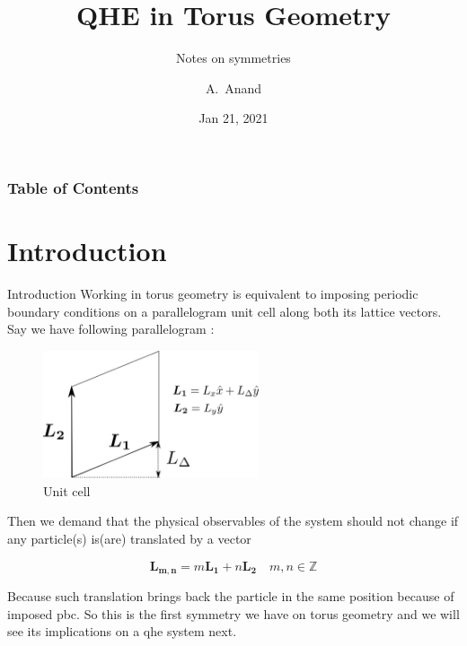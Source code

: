 \documentclass{beamer}
\title[Torus]
{QHE in Torus Geometry}
\subtitle{Notes on symmetries}
\author[Abhishek]
{A.~Anand\inst{1}}
\institute[IISERP]
{
  \inst{1}%
  Indian Institute of Science Education and Research\newline
  Pune
}
\date{Jan 21, 2021}
\newcommand{\bsym}{\boldsymbol}
\begin{document}
	\begin{frame}[plain] \titlepage \end{frame} 
	\begin{frame}                                                                                                                                                        
    		\frametitle{Table of Contents}
    		\tableofcontents[currentsection]                                                                                                                                
	\end{frame} 
	
	\section{Introduction}

	
	\begin{frame}{Introduction}
  		Working in torus geometry is equivalent to imposing periodic boundary conditions on a parallelogram unit 				cell along both its lattice vectors. Say we have following parallelogram :

 		 \begin{figure}
    			\centering
    			\includegraphics[width=2.5in]{figures/pngs/unit_cell_torus.png}
   			\caption{Unit cell}
    			\label{fig1}
  		\end{figure}

  		Then we demand that the physical observables of the system should not change if any particle(s) is(are) translated 
  		by a vector
  
  		\begin{equation*}
    			\bsym{L_{m,n}} = m\bsym{L_1} + n\bsym{L_2}\quad m,n\in \mathbb{Z}
  		\end{equation*}
  
  			Because such translation brings back the particle in the same position because of imposed pbc. So this 
  			is the first symmetry we have on torus geometry and we will see its implications on a qhe system next.
  	\end{frame}
	
\end{document}
